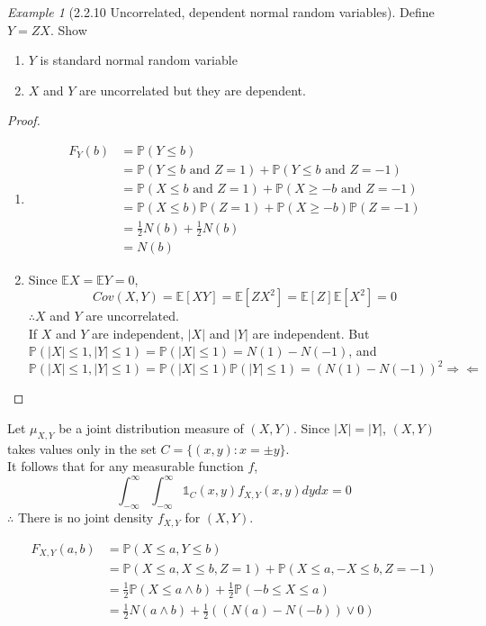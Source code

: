 \documentclass[12pt]{report}
\renewcommand{\1}{\mathbb{1}}
\theoremstyle{break}
\theoremstyle{newdef}
\theoremstyle{remark}
\newtheorem*{exmp}{Example} %
\begin{document}
\begin{appendices}
\begin{exmp}[2.2.10 Uncorrelated, dependent normal random variables]
Define $Y = ZX$.
Show
\begin{enumerate}
\item $Y$ is standard normal random variable
\item $X$ and $Y$ are uncorrelated but they are dependent.
\end{enumerate}


\begin{proof}
\leavevmode
\begin{enumerate}
\item
$$
\begin{aligned}
F_Y(b) &= \mathbb{P}(Y \leq b)\\
&= \mathbb{P}(Y \leq b \text{ and } Z = 1)
+ \mathbb{P}(Y \leq b \text{ and } Z = -1)\\
&= \mathbb{P}(X \leq b \text{ and } Z = 1)
+ \mathbb{P}(X \geq -b \text{ and } Z = -1)\\
&= \mathbb{P}(X \leq b)\mathbb{P}(Z=1)
+ \mathbb{P}(X \geq -b)\mathbb{P}(Z=-1)\\
&= \frac{1}{2}N(b) + \frac{1}{2}N(b)\\
&=N(b)
\end{aligned}
$$

\item
Since $\mathbb{E}X = \mathbb{E}Y = 0$,
$$Cov(X,Y) = \mathbb{E}[XY] = \mathbb{E}[ZX^2] = \mathbb{E}[Z]\mathbb{E}[X^2] = 0$$
$\therefore X$ and $Y$ are uncorrelated.\\
If $X$ and $Y$ are independent, $|X|$ and $|Y|$ are independent.
But $\mathbb{P}(|X| \leq 1, |Y| \leq 1) = \mathbb{P}(|X| \leq 1) = N(1) - N(-1)$, and $\mathbb{P}(|X| \leq 1, |Y| \leq 1) = \mathbb{P}(|X| \leq 1) \mathbb{P}(|Y| \leq 1) = (N(1)-N(-1))^2
\Rightarrow\!\Leftarrow$

\end{enumerate}
\end{proof}

Let $\mu_{X,Y}$ be a joint distribution measure of $(X,Y)$.
Since $|X| = |Y|$, $(X,Y)$ takes values only in the set
$C = \{(x,y): x = \pm y\}$.\\
It follows that for any measurable function $f$,
$$
\int_{-\infty}^\infty \int_{-\infty}^\infty \mathbb{1}_C(x,y) f_{X,Y}(x,y) dydx = 0
$$
$\therefore$ There is no joint density $f_{X,Y}$ for $(X,Y)$.


$$
\begin{aligned}
F_{X,Y}(a,b) &= \mathbb{P}(X \leq a, Y \leq b)\\
&= \mathbb{P}(X \leq a, X \leq b, Z = 1) + \mathbb{P}(X \leq a, -X \leq b, Z = -1)\\
&= \frac{1}{2} \mathbb{P}(X \leq a \wedge b) + \frac{1}{2}\mathbb{P}(-b \leq X \leq a)\\
&= \frac{1}{2} N(a \wedge b) + \frac{1}{2} ((N(a)-N(-b)) \vee 0)
\end{aligned}
$$
\end{exmp}


\end{appendices}
\end{document}
